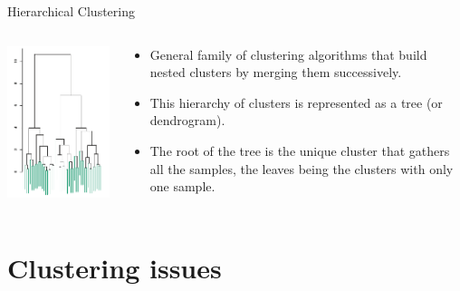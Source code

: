 \documentclass{beamer}
\begin{document}
\begin{frame}{Hierarchical Clustering}

\begin{columns}[T]

\begin{column}{0.33\textwidth}
\includegraphics[scale=0.75]{./figures/hierarchy.png}
\end{column}
\begin{column}{0.66\textwidth}
\begin{itemize}
\item General family of clustering algorithms that {\color{blue}build nested clusters by merging them successively}.\\[2em]

\item This hierarchy of clusters is represented as a tree (or dendrogram).\\[2em]

\item The root of the tree is the unique cluster that gathers all the samples, the leaves being the clusters with only one sample.
\end{itemize}
\end{column}

\end{columns}

\end{frame}



\section{Clustering issues}
\end{document}
